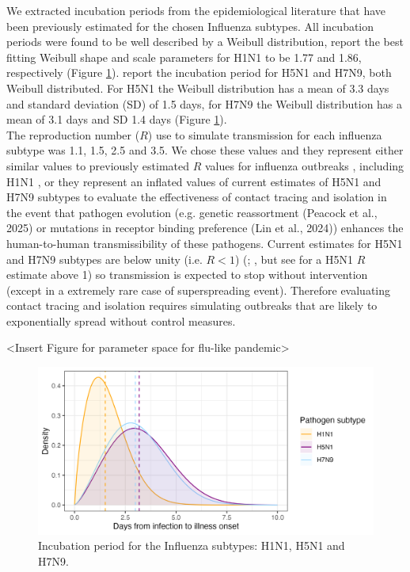 \documentclass{article}
\begin{document}
We extracted incubation periods from the epidemiological literature that have been previously estimated for the chosen Influenza subtypes. All incubation periods were found to be well described by a Weibull distribution, \cite{nishiuraEstimationIncubationPeriod2011} report the best fitting Weibull shape and scale parameters for H1N1 to be 1.77 and 1.86, respectively (Figure \ref{fig:incub}). \cite{cowlingComparativeEpidemiologyHuman2013} report the incubation period for H5N1 and H7N9, both Weibull distributed. For H5N1 the Weibull distribution has a mean of 3.3 days and standard deviation (SD) of 1.5 days, for H7N9 the Weibull distribution has a mean of 3.1 days and SD 1.4 days \citep{cowlingComparativeEpidemiologyHuman2013} (Figure \ref{fig:incub}). \\

The reproduction number ($R$) use to simulate transmission for each influenza subtype was 1.1, 1.5, 2.5 and 3.5. We chose these values and they represent either similar values to previously estimated $R$ values for influenza outbreaks \citep{fergusonStrategiesMitigatingInfluenza2006}, including H1N1 \citep{fraserPandemicPotentialStrain2009, lesslerOutbreak2009Pandemic2009}, or they represent an inflated values of current estimates of H5N1 and H7N9 subtypes to evaluate the effectiveness of contact tracing and isolation in the event that pathogen evolution (e.g. genetic reassortment (Peacock et al., 2025) or mutations in receptor binding preference (Lin et al., 2024)) enhances the human-to-human transmissibility of these pathogens. Current estimates for H5N1 and H7N9 subtypes are below unity (i.e. $R < 1$) (\citealt{tannerPandemicPotentialAvian2015}; \citealt{Ward2024.12.11.24318702}, but see \citealt{yangDetectingHumanhumanTransmission2007a} for a H5N1 $R$ estimate above 1) so transmission is expected to stop without intervention (except in a extremely rare case of superspreading event). Therefore evaluating contact tracing and isolation requires simulating outbreaks that are likely to exponentially spread without control measures.

<Insert Figure for parameter space for flu-like pandemic>

\begin{figure}[ht]
\centering
\includegraphics[width=\textwidth]{../plots/incubation_period.png}
\caption{Incubation period for the Influenza subtypes: H1N1, H5N1 and H7N9.}
\label{fig:incub}
\end{figure}
\end{document}
